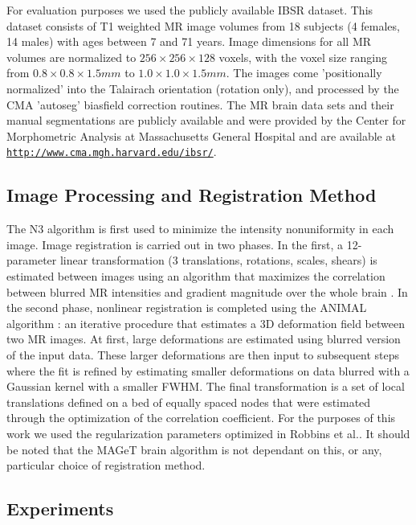 \documentclass{article}\usepackage{graphicx, color}
\begin{document}
For evaluation purposes we used the publicly available IBSR dataset.  This
dataset consists of T1 weighted MR image volumes from 18 subjects (4 females,
14 males) with ages between 7 and 71 years. Image dimensions for all MR volumes
are normalized to  $256  \times 256 \times 128$ voxels, with the voxel size
ranging from $0.8 \times 0.8 \times 1.5 mm$ to $1.0 \times 1.0 \times 1.5 mm$.
The images come 'positionally normalized' into the Talairach orientation
(rotation only), and processed by the CMA 'autoseg' biasfield correction
routines. The MR brain data sets and their manual segmentations are publicly
available and were provided by the Center for Morphometric Analysis at
Massachusetts General Hospital and are available at
\href{http://www.cma.mgh.harvard.edu/ibsr/}
{\nolinkurl{http://www.cma.mgh.harvard.edu/ibsr/}}. 

\subsection{Image Processing and Registration Method}
The N3 algorithm \cite{Sled1998} is first used to minimize the intensity
nonuniformity in each image.  Image registration is carried out in two phases.
In the first, a 12-parameter linear transformation (3 translations, rotations,
scales, shears) is estimated between images using an algorithm that maximizes
the correlation between blurred MR intensities and gradient magnitude over the
whole brain \cite{Collins}.  In the second phase, nonlinear registration is
completed using the ANIMAL algorithm \cite{Collins1995}: an iterative procedure
that estimates a 3D deformation field between two MR images. At first, large
deformations are estimated using blurred version of the input data. These
larger deformations are then input to subsequent steps where the fit is refined
by estimating smaller deformations on data blurred with a Gaussian kernel with
a smaller FWHM. The final transformation is a set of local translations defined
on a bed of equally spaced nodes that were estimated through the optimization
of the correlation coefficient. For the purposes of this work we used the
regularization parameters optimized in Robbins et al.\cite{Robbins2004}. It
should be noted that the MAGeT brain algorithm is not dependant on this, or
any, particular choice of registration method\cite{Chakravarty2012}.

\subsection{Experiments}
\end{document}
